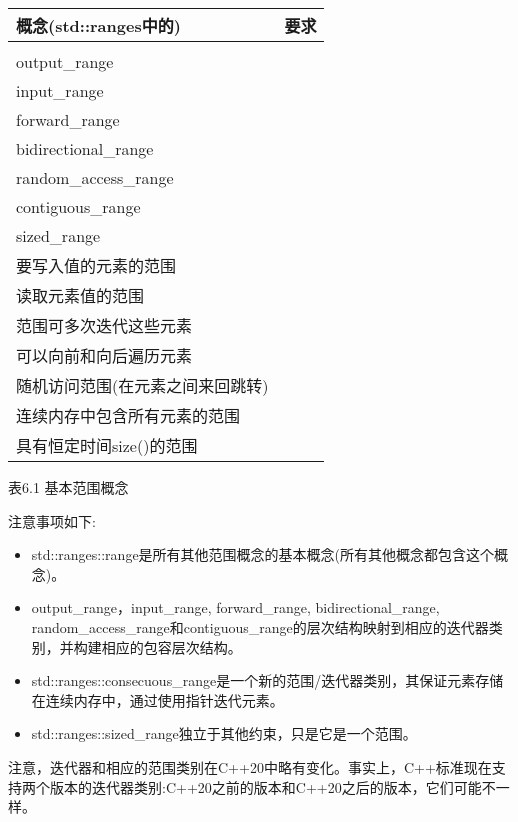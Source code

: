 \begin{longtable}[c]{|l|l|}
\hline
\textbf{概念(std::ranges中的)} &
\textbf{要求} \\ \hline
\endfirsthead
%
\endhead
%
\begin{tabular}[c]{@{}l@{}}range\\ output\_range\\ input\_range\\ forward\_range\\ bidirectional\_range\\ random\_access\_range\\ contiguous\_range\\ sized\_range\end{tabular} &
\begin{tabular}[c]{@{}l@{}}可以从头到尾迭代吗\\ 要写入值的元素的范围\\ 读取元素值的范围\\ 范围可多次迭代这些元素\\ 可以向前和向后遍历元素\\ 随机访问范围(在元素之间来回跳转)\\ 连续内存中包含所有元素的范围\\ 具有恒定时间size()的范围\end{tabular} \\ \hline
\end{longtable}

\begin{center}
表6.1 基本范围概念
\end{center}

注意事项如下:

\begin{itemize}
\item
std::ranges::range是所有其他范围概念的基本概念(所有其他概念都包含这个概念)。

\item
output\_range，input\_range, forward\_range, bidirectional\_range, random\_access\_range和contiguous\_range的层次结构映射到相应的迭代器类别，并构建相应的包容层次结构。

\item
std::ranges::consecuous\_range是一个新的范围/迭代器类别，其保证元素存储在连续内存中，通过使用指针迭代元素。

\item
std::ranges::sized\_range独立于其他约束，只是它是一个范围。
\end{itemize}

注意，迭代器和相应的范围类别在C++20中略有变化。事实上，C++标准现在支持两个版本的迭代器类别:C++20之前的版本和C++20之后的版本，它们可能不一样。

